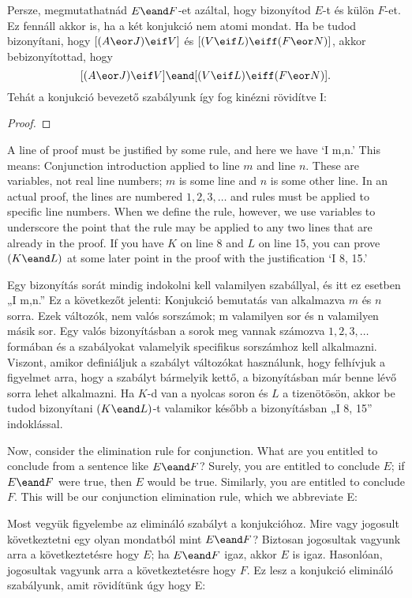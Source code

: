 Persze, megmutathatnád $E \eand F$-et azáltal, hogy bizonyítod $E$-t és külön $F$-et.
Ez fennáll akkor is, ha a két konjukció nem atomi mondat. Ha be tudod bizonyítani, hogy  $[(A \eor J) \eif V]$ és  $[(V \eif L) \eiff (F \eor N)]$, akkor bebizonyítottad, hogy
$$[(A \eor J) \eif V] \eand [(V \eif L) \eiff (F \eor N)].$$
Tehát a konjukció bevezető szabályunk így fog kinézni rövidítve {\eand}I:
 
\begin{proof}
	 
\end{proof}

A line of proof must be justified by some rule, and here we have `{\eand}I m,n.' This means: Conjunction introduction applied to line $m$ and line $n$. These are variables, not real line numbers; $m$ is some line and $n$ is some other line. In an actual proof, the lines are numbered $1, 2, 3, \ldots$ and rules must be applied to specific line numbers. When we define the rule, however, we use variables to underscore the point that the rule may be applied to any two lines that are already in the proof. If you have $K$ on line 8 and $L$ on line 15, you can prove $(K\eand L)$ at some later point in the proof with the justification `{\eand}I 8, 15.'

Egy bizonyítás sorát mindig indokolni kell valamilyen szabállyal, és itt ez esetben „{\eand}I m,n.”
Ez a következőt jelenti: Konjukció bemutatás van alkalmazva $m$ és $n$ sorra. Ezek változók, nem valós sorszámok; m valamilyen sor és n valamilyen másik sor. Egy valós bizonyításban a sorok meg vannak számozva $1, 2, 3, \ldots$ formában és a szabályokat valamelyik specifikus sorszámhoz kell alkalmazni. Viszont, amikor definiáljuk a szabályt változókat használunk, hogy felhívjuk a figyelmet arra, hogy a szabályt bármelyik kettő, a bizonyításban már benne lévő sorra lehet alkalmazni. Ha $K$-d van a nyolcas soron és $L$ a tizenötösön, akkor be tudod bizonyítani $(K\eand L)$-t valamikor később a bizonyításban „{\eand}I 8, 15” indoklással.

Now, consider the elimination rule for conjunction. What are you entitled to conclude from a sentence like $E \eand F$? Surely, you are entitled to conclude $E$; if $E \eand F$ were true, then $E$ would be true. Similarly, you are entitled to conclude $F$. This will be our conjunction elimination rule, which we abbreviate {\eand}E:

Most vegyük figyelembe az elimináló szabályt a konjukcióhoz. Mire vagy jogosult következtetni egy olyan mondatból mint $E \eand F$?  Biztosan jogosultak vagyunk arra a következtetésre hogy $E$; ha $E \eand F$ igaz, akkor $E$ is igaz. Hasonlóan, jogosultak vagyunk arra a következtetésre hogy $F$. Ez lesz a konjukció elimináló szabályunk, amit rövidítünk úgy hogy {\eand}E:

